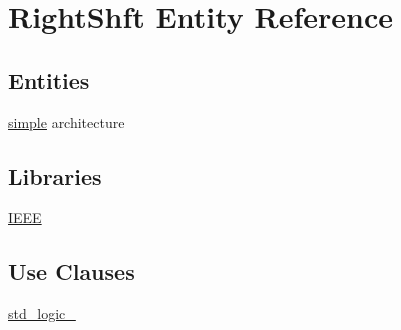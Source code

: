 \hypertarget{class_right_shft}{}\section{Right\+Shft Entity Reference}
\label{class_right_shft}
\subsection*{Entities}
\begin{DoxyCompactItemize}
\item 
\hyperlink{class_right_shft_1_1simple}{simple} architecture
\end{DoxyCompactItemize}
\subsection*{Libraries}
 \begin{DoxyCompactItemize}
\item 
\hyperlink{class_right_shft_ae4f03c286607f3181e16b9aa12d0c6d4}{I\+E\+E\+E} 
\end{DoxyCompactItemize}
\subsection*{Use Clauses}
 \begin{DoxyCompactItemize}
\item 
\hyperlink{class_right_shft_acd03516902501cd1c7296a98e22c6fcb}{std\+\_\+logic\+\_}   
\end{DoxyCompactItemize}
